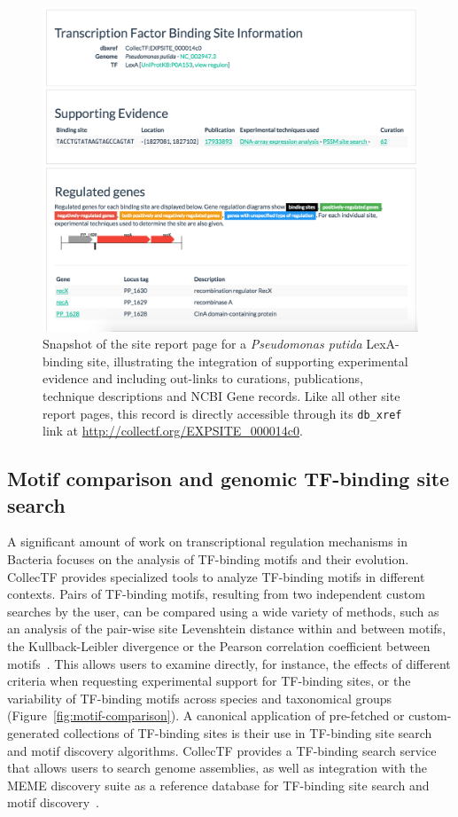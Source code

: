 \begin{figure}
  \centering
  \includegraphics[width=\textwidth]{figures/chapter2/individual-site}
  \caption{Snapshot of the site report page for a \textit{Pseudomonas putida}
    LexA-binding site, illustrating the integration of supporting experimental
    evidence and including out-links to curations, publications, technique
    descriptions and NCBI Gene records. Like all other site report pages, this
    record is directly accessible through its \texttt{db\_xref} link at
    \url{http://collectf.org/EXPSITE_000014c0}.}
\label{fig:individual-site}
\end{figure}

\subsection{Motif comparison and genomic TF-binding site search}

A significant amount of work on transcriptional regulation mechanisms in
Bacteria focuses on the analysis of TF-binding motifs and their
evolution. CollecTF provides specialized tools to analyze TF-binding motifs in
different contexts. Pairs of TF-binding motifs, resulting from two independent
custom searches by the user, can be compared using a wide variety of methods,
such as an analysis of the pair-wise site Levenshtein distance within and
between motifs, the Kullback-Leibler divergence or the Pearson correlation
coefficient between motifs~\cite{vanet1999promoter, mahony2007stamp}. This
allows users to examine directly, for instance, the effects of different
criteria when requesting experimental support for TF-binding sites, or the
variability of TF-binding motifs across species and taxonomical groups
(Figure~\ref{fig:motif-comparison}). A canonical application of pre-fetched or
custom-generated collections of TF-binding sites is their use in TF-binding
site search and motif discovery algorithms. CollecTF provides a TF-binding
search service that allows users to search genome assemblies, as well as
integration with the MEME discovery suite as a reference database for
TF-binding site search and motif discovery~\cite{bailey2006meme}.

